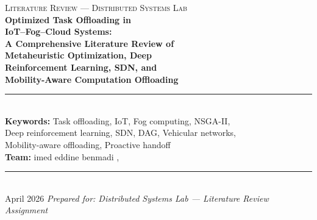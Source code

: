\documentclass[12pt,a4paper]{article}
\begin{document}

\begin{titlepage}
  \centering
  \vspace*{1.5cm}
  {\small\textcolor{midblue}{\textsc{Literature Review --- Distributed Systems Lab}}}\\[0.8cm]
  {\LARGE\bfseries\color{darkblue}
    Optimized Task Offloading in\\[0.3em]
    IoT--Fog--Cloud Systems:\\[0.4em]
    A Comprehensive Literature Review of\\[0.3em]
    Metaheuristic Optimization, Deep\\[0.3em]
    Reinforcement Learning, SDN, and\\[0.3em]
    Mobility-Aware Computation Offloading
  }\\[1.2cm]
  \rule{0.55\linewidth}{0.4pt}\\[1.0cm]
  {\normalsize
    \textbf{Keywords:} Task offloading, IoT, Fog computing, NSGA-II,\\
    Deep reinforcement learning, SDN, DAG, Vehicular networks,\\
    Mobility-aware offloading, Proactive handoff
  }\\[1.5cm]
  {\normalsize
    \textbf{Team:} imed eddine benmadi , 
  }\\[1.5cm]
  \rule{0.55\linewidth}{0.4pt}\\[0.8cm]
  {\normalsize\textcolor{midblue}{April 2026}}
  \vfill
  {\small\textit{Prepared for: Distributed Systems Lab --- Literature Review Assignment}}
\end{titlepage}
\end{document}
